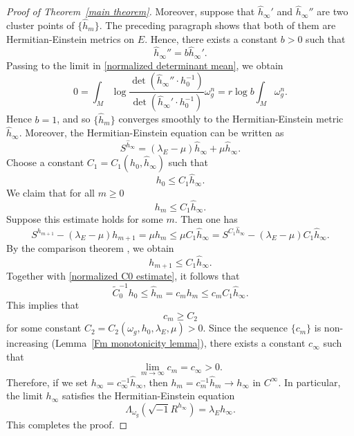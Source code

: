 \documentclass[12pt, reqno]{amsart}
\theoremstyle{plain}
\theoremstyle{definition}
\newcommand{\beq}{\begin{equation}}
\newcommand{\eeq}{\end{equation}}
\renewcommand{\hat}{\widehat}
\renewcommand{\tilde}{\widetilde}
\renewcommand{\>}{\rightarrow}
\numberwithin{equation}{section}
\begin{document}
\begin{proof}[Proof of Theorem~\ref{main theorem}]
	Moreover, suppose that  $\hat h_\infty'$ and $\hat h_\infty''$  are two cluster points of
	$\{\hat h_m\}$.  The preceding paragraph shows that both of them are
	Hermitian-Einstein metrics on $E$. Hence, there exists a constant $b>0$ such that  \beq \hat h_\infty''=b \hat h_\infty'.\eeq  Passing to the limit in \eqref{normalized determinant mean}, we obtain
	\beq 
	0=\int_M\log
	\frac{\det\left(\hat h_\infty''\cdot h_0^{-1}\right)}
	{\det\left(\hat h_\infty'\cdot h_0^{-1}\right)}
	\omega_g^n
	=r\log b\int_M\omega_g^n.
	\eeq 
	Hence $b=1$, and so $\{\hat h_m\}$  converges
	smoothly to the Hermitian-Einstein metric
	$\hat h_\infty$. Moreover, the  Hermitian-Einstein equation can be written as
	\begin{equation}
	S^{\hat h_\infty}=(\lambda_E-\mu)\hat h_\infty+\mu\hat h_\infty.
	\label{fixed point equation}
	\end{equation}
	Choose a constant $C_1=C_1(h_0,\hat h_\infty)$ such that
	\begin{equation}
	h_0\leq C_1\hat h_\infty.
	\label{reduce to original sequence 1}
	\end{equation}
	We claim that for all $m\geq 0$ 
	\beq 
	h_m\leq C_1\hat h_\infty. \label{reduce to original sequence 2}
	\eeq  
	Suppose this  estimate holds for some $m$.  Then one has
	\beq 
	S^{h_{m+1}}-(\lambda_E-\mu)h_{m+1}
	=\mu h_m
	\leq \mu C_1\hat h_\infty
	=S^{C_1\hat h_\infty}-(\lambda_E-\mu)C_1\hat h_\infty .
	\eeq 
	By the comparison theorem \cite[Theorem~2.3]{WYY26b+}, we obtain
	\begin{equation}
	h_{m+1}\leq C_1\hat h_\infty.
	\end{equation}
	Together with  \eqref{normalized C0 estimate}, it follows that 
	\beq
	\tilde C_0^{-1}h_0\leq \hat h_m= c_mh_m\leq c_mC_1\hat h_\infty.
	\eeq
	This implies that 
	\beq 
	c_m\geq C_2
	\eeq 
	for some constant $C_2=C_2(\omega_g, h_0, \lambda_E, \mu)>0$. Since the sequence $\{c_m\}$ is non-increasing (Lemma~\ref{Fm monotonicity lemma}), there exists a constant $c_\infty$ such that
	\begin{equation}
	\lim_{m\to\infty}c_m=c_\infty>0.
	\label{c limit}
	\end{equation}
	Therefore, if we set $h_\infty= c_\infty^{-1}\hat h_\infty$, then
	$	h_m=c_m^{-1}\hat h_m\> h_\infty$ in $C^\infty$.   In particular,  the limit $h_\infty$ satisfies the Hermitian-Einstein equation
	\beq
	\Lambda_{\omega_g}\left(\sqrt{-1}R^{ h_\infty}\right)
	=\lambda_E h_\infty .
	\eeq
	This completes the proof.
\end{proof}
\end{document}
